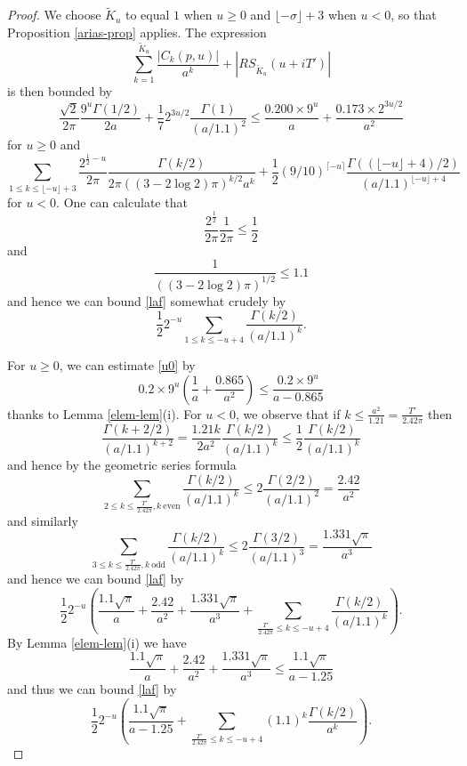 \begin{proof}
We choose $\tilde K_u$ to equal $1$ when $u \geq 0$ and $\lfloor -\sigma \rfloor + 3$ when $u < 0$, so that Proposition \ref{arias-prop} applies.  The expression
$$ \sum_{k=1}^{\tilde K_u} \frac{|C_k(p,u)|}{a^k} + |RS_{\tilde K_u}(u + iT')| $$
is then bounded by
\begin{equation}\label{u0}
 \frac{\sqrt{2}}{2\pi} \frac{9^u \Gamma(1/2)}{2a} + \frac{1}{7} 2^{3u/2} \frac{\Gamma(1)}{(a/1.1)^2}
\leq \frac{0.200 \times 9^u}{a} + \frac{0.173 \times 2^{3u/2}}{a^2} 
\end{equation}
for $u \geq 0$ and
\begin{equation}\label{laf}
 \sum_{1 \leq k \leq \lfloor -u \rfloor+3} \frac{2^{\frac{1}{2}-u}}{2\pi} \frac{\Gamma(k/2)}{2\pi ((3-2\log 2)\pi)^{k/2} a^k} + \frac{1}{2} (9/10)^{\lceil -u \rceil} \frac{\Gamma((\lfloor -u \rfloor+4)/2)}{(a/1.1)^{\lfloor -u \rfloor+4}}
\end{equation}
for $u < 0$.  One can calculate that
$$ \frac{2^{\frac{1}{2}}}{2\pi} \frac{1}{2\pi} \leq \frac{1}{2}$$
and
$$ \frac{1}{((3-2\log 2)\pi)^{1/2}} \leq 1.1$$
and hence we can bound \eqref{laf} somewhat crudely by
$$ \frac{1}{2} 2^{-u} \sum_{1 \leq k \leq -u+4} \frac{\Gamma(k/2)}{(a/1.1)^k}.$$

For $u \geq 0$, we can estimate \eqref{u0} by
$$ 0.2 \times 9^u (\frac{1}{a} + \frac{0.865}{a^2}) \leq \frac{0.2 \times 9^u}{a - 0.865}$$
thanks to Lemma \ref{elem-lem}(i).  For $u<0$, we observe that if $k \leq \frac{a^2}{1.21} = \frac{T'}{2.42 \pi}$ then
$$ \frac{\Gamma(k+2/2)}{(a/1.1)^{k+2}} = \frac{1.21 k}{2 a^2} \frac{\Gamma(k/2)}{(a/1.1)^k} \leq \frac{1}{2} \frac{\Gamma(k/2)}{(a/1.1)^k}$$
and hence by the geometric series formula
$$ \sum_{2 \leq k \leq \frac{T'}{2.42 \pi}, k\ \mathrm{even}} \frac{\Gamma(k/2)}{(a/1.1)^k}  \leq 2 \frac{\Gamma(2/2)}{(a/1.1)^2} = \frac{2.42}{a^2}$$
and similarly
$$ \sum_{3 \leq k \leq \frac{T'}{2.42 \pi}, k\ \mathrm{odd}} \frac{\Gamma(k/2)}{(a/1.1)^k}  \leq 2 \frac{\Gamma(3/2)}{(a/1.1)^3} = \frac{1.331 \sqrt{\pi}}{a^3}$$
and hence we can bound \eqref{laf} by
$$ \frac{1}{2} 2^{-u} \left(\frac{1.1 \sqrt{\pi}}{a} + \frac{2.42}{a^2} + \frac{1.331 \sqrt{\pi}}{a^3} + \sum_{\frac{T'}{2.42 \pi} \leq k \leq -u+4} \frac{\Gamma(k/2)}{(a/1.1)^k} \right).$$
By Lemma \ref{elem-lem}(i) we have
$$ \frac{1.1 \sqrt{\pi}}{a} + \frac{2.42}{a^2} + \frac{1.331 \sqrt{\pi}}{a^3} \leq \frac{1.1 \sqrt{\pi}}{a - 1.25}$$
and thus we can bound \eqref{laf} by
$$ \frac{1}{2} 2^{-u} \left(\frac{1.1 \sqrt{\pi}}{a-1.25} + \sum_{\frac{T'}{2.42 \pi} \leq k \leq -u+4} (1.1)^{k} \frac{\Gamma(k/2)}{a^k} \right).$$


\end{proof}
